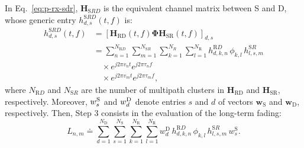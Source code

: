 \begin{enumerate}
In Eq.~\eqref{eq:p-rx-sdr}, $\bm{H}_{\mathrm SRD}$ is the equivalent channel matrix between S and D, whose generic entry  $h^{\mathrm SRD}_{d, s} (t, f)$ is:
\begin{equation}
\begin{aligned}
\label{eq:psd_relay_sums}
h^{\mathrm SRD}_{d, s} (t, f) &= \left[ \bm{H}_{\textrm {RD}} (t, f) \bm{\Phi} \bm{H}_{\textrm {SR}} (t, f) \right]_{d, s} \\
& = \sum_{n=1}^{N_{\mathrm RD}} \sum_{m=1}^{N_{\mathrm SR}} \sum_{k=1}^{N_{R}} \sum_{l=1}^{N_{\mathrm R}} h^{\mathrm RD}_{d, k, n} \, \phi_{k, l} \, h^{\mathrm SR}_{l, s, m} \\
& \quad \times e^{j 2 \pi v_{n} t} e^{j 2 \pi \tau_{n} f} \\
& \quad \times e^{j 2 \pi v_{m} t} e^{j 2 \pi \tau_{m} f},
\end{aligned}
\end{equation}
where $N_{\mathrm RD}$ and $N_{\mathrm SR}$ are the number of multipath clusters in $\bm{H}_{\textrm {RD}}$ and $\bm{H}_{\textrm {SR}}$, respectively. Moreover, $w^{\textrm S}_{s}$ and $w^{\textrm D}_{d}$ denote entries $s$ and $d$ of vectors $\bm{w}_{\mathrm S}$ and $\bm{w}_{\mathrm D}$, respectively.
Then, Step 3 consists in the evaluation of the long-term fading:
\begin{equation}
L_{n, m} \doteq \sum_{d=1}^{N_{\mathrm D}} \sum_{s=1}^{N_{\mathrm S}} \sum_{k=1}^{N_{\mathrm R}} \sum_{l=1}^{N_{\mathrm R}} w^{\mathrm D}_{d} \, h^{\mathrm RD}_{d, k, n} \, \phi_{k, l} \, h^{\mathrm SR}_{l, s, m} \, w^{\mathrm S}_{s}. 
\end{equation}


\end{enumerate}
